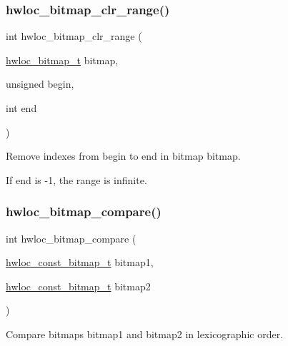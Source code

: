 \mbox{\label{a00205_ga833776709df94d727f8c22304b3388cf}} 
\subsubsection{\texorpdfstring{hwloc\+\_\+bitmap\+\_\+clr\+\_\+range()}{hwloc\_bitmap\_clr\_range()}}
{\footnotesize\ttfamily int hwloc\+\_\+bitmap\+\_\+clr\+\_\+range (\begin{DoxyParamCaption}\item[{\hyperlink{a00205_gaa3c2bf4c776d603dcebbb61b0c923d84}{hwloc\+\_\+bitmap\+\_\+t}}]{bitmap,  }\item[{unsigned}]{begin,  }\item[{int}]{end }\end{DoxyParamCaption})}



Remove indexes from {\ttfamily begin} to {\ttfamily end} in bitmap {\ttfamily bitmap}. 

If {\ttfamily end} is {\ttfamily -\/1}, the range is infinite. \mbox{\label{a00205_ga14cdbc0ef0a705e84999bd48a2e649f3}} 
\subsubsection{\texorpdfstring{hwloc\+\_\+bitmap\+\_\+compare()}{hwloc\_bitmap\_compare()}}
{\footnotesize\ttfamily int hwloc\+\_\+bitmap\+\_\+compare (\begin{DoxyParamCaption}\item[{\hyperlink{a00205_gae991a108af01d408be2776c5b2c467b2}{hwloc\+\_\+const\+\_\+bitmap\+\_\+t}}]{bitmap1,  }\item[{\hyperlink{a00205_gae991a108af01d408be2776c5b2c467b2}{hwloc\+\_\+const\+\_\+bitmap\+\_\+t}}]{bitmap2 }\end{DoxyParamCaption})}



Compare bitmaps {\ttfamily bitmap1} and {\ttfamily bitmap2} in lexicographic order. 

